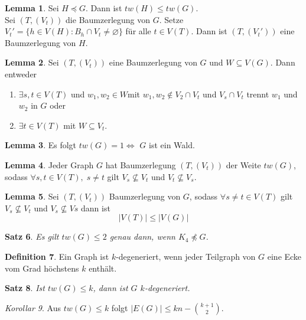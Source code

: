 \documentclass[a4paper, 12pt]{article}
\theoremstyle{plain}
\newtheorem{theorem}{Satz}[subsection] %
\theoremstyle{definition}
\newtheorem{definition}[theorem]{Definition} %
\theoremstyle{lemma}
\newtheorem{lemma}[theorem]{Lemma}
\theoremstyle{remark}
\theoremstyle{corollary}
\newtheorem{corollary}[theorem]{Korollar}
\theoremstyle{example}
\begin{document}
	\begin{lemma}
		Sei $H\preceq G$. Dann ist $tw(H)\leq tw(G)$.\\
		Sei $(T,(V_t))$ die Baumzerlegung von $G$. Setze $V_t' = \{h \in V(H): B_h \cap V_t \neq \varnothing\}$ für alle $t \in V(T)$. Dann ist $(T,(V_t'))$ eine Baumzerlegung von $H$.
	\end{lemma}
	\begin{lemma}
		Sei $(T,(V_t))$ eine Baumzerlegung von $G$ und $W\subseteq V(G)$. Dann entweder \begin{enumerate}
			\item $\exists s,t \in V(T)$ und $w_1,w_2 \in W$mit $w_1,w_2 \notin V_2 \cap V_t$ und $V_s \cap V_t$ trennt $w_1$ und $w_2$ in $G$ oder
			\item $\exists t \in V(T)$ mit $W \subseteq V_t$.
		\end{enumerate}
	\end{lemma}
	\begin{lemma}
		Es folgt $tw(G) = 1 \Leftrightarrow $ $G$ ist ein Wald.
	\end{lemma}
	\begin{lemma}
		Jeder Graph $G$ hat Baumzerlegung $(T,(V_t))$ der Weite $tw(G)$, sodass $\forall s,t \in V(T), \; s\neq t$ gilt $V_s \not \subseteq V_t$ und $V_t \not \subseteq V_s$.
	\end{lemma}
	\begin{lemma}
		Sei $(T,(V_t))$ Baumzerlegung von $G$, sodass $\forall s \neq t \in V(T)$ gilt $V_s \not \subseteq V_t$ und $V_s \not \subseteq Vs$ dann ist \[\left|V(T)\right| \leq \left|V(G)\right|\]
	\end{lemma}
	\begin{theorem}
		Es gilt $tw(G) \leq 2$ genau dann, wenn $K_4 \not \preceq G$.
	\end{theorem}
	\begin{definition}
		Ein Graph ist $k$-degeneriert, wenn jeder Teilgraph von $G$ eine Ecke vom Grad höchstens $k$ enthält.
	\end{definition}
	\begin{theorem}
		Ist $tw(G) \leq k$, dann ist $G$ $k$-degeneriert.
	\end{theorem}
	\begin{corollary}
		Aus $tw(G) \leq k$ folgt $\left|E(G)\right| \leq kn - \binom{k+1}{2}$. 
	\end{corollary}
\end{document}
